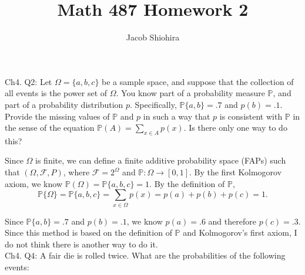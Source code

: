 \documentclass[12pt]{article}
\begin{document}
\title{Math 487 Homework 2}
\author{Jacob Shiohira}
\maketitle

\noindent
Ch4. Q2: Let $\Omega = \{ a,b,c \}$ be a sample space, and suppose that the collection of all events is the power set of $\Omega$. You know part of a probability measure $\mathbb{P}$, and part of a probability distribution $p$. Specifically, $\mathbb{P} \{ a,b \} = .7$ and $p(b) = .1$. Provide the missing values of $\mathbb{P}$ and $p$ in such a way that $p$ is consistent with $\mathbb{P}$ in the sense of the equation $\mathbb{P}(A) = \sum_{x \in A} p(x)$. Is there only one way to do this? 
\vspace{.5cm}

\noindent
Since $\Omega$ is finite, we can define a finite additive probability space (FAPs) such that $(\Omega, \mathcal{F}, P)$, where $\mathcal{F} = 2^{\Omega}$ and $\mathbb{P} : \Omega \rightarrow [0,1]$. By the first Kolmogorov axiom, we know $\mathbb{P}(\Omega) = \mathbb{P} \{ a,b,c \} = 1$. By the definition of $\mathbb{P}$,
\begin{equation*}
\mathbb{P}\{ \Omega \} = \mathbb{P}\{ a,b,c \} = \sum_{x \in \Omega } p(x) = p(a) + p(b) + p(c) = 1.
\end{equation*}

\noindent
Since $\mathbb{P} \{ a,b \} = .7$ and $p(b) = .1$, we know $p(a) = .6$ and therefore $p(c)=.3$. Since this method is based on the definition of $\mathbb{P}$ and Kolmogorov's first axiom, I do not think there is another way to do it. \\



\noindent
Ch4. Q4: A fair die is rolled twice. What are the probabilities of the following events: 
\end{document}
